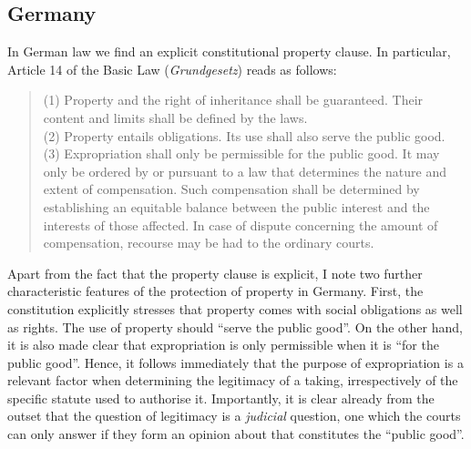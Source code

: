 \subsection{Germany}

In German law we find an explicit constitutional property clause. In particular, Article 14 of the Basic Law ({\it Grundgesetz}) reads as follows:

\begin{quote}
(1) Property and the right of inheritance shall be guaranteed. Their content and limits shall be defined by the laws. \\
(2) Property entails obligations. Its use shall also serve the public good. \\
(3) Expropriation shall only be permissible for the public good. It may only be ordered by or pursuant to a law that determines the nature and extent of compensation. Such compensation shall be determined by establishing an equitable balance between the public interest and the interests of those affected. In case of dispute concerning the amount of compensation, recourse may be had to the ordinary courts.
\end{quote}

Apart from the fact that the property clause is explicit, I note two further characteristic features of the protection of property in Germany. First, the constitution explicitly stresses that property comes with social obligations as well as rights. The use of property should ``serve the public good''. On the other hand, it is also made clear that expropriation is only permissible when it is ``for the public good''. Hence, it follows immediately that the purpose of expropriation is a relevant factor when determining the legitimacy of a taking, irrespectively of the specific statute used to authorise it. Importantly, it is clear already from the outset that the question of legitimacy is a \emph{judicial} question, one which the courts can only answer if they form an opinion about that constitutes the ``public good''. 

